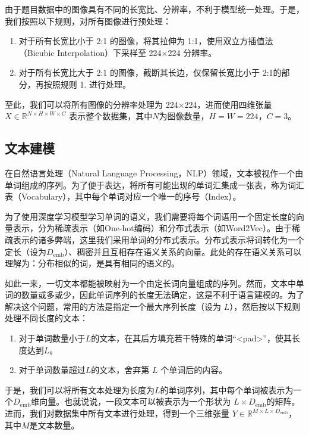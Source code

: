 \documentclass[a4paper]{zreport}
\begin{document}
由于题目数据中的图像具有不同的长宽比、分辨率，不利于模型统一处理。于是，我们按照以下规则，对所有图像进行预处理：

\begin{enumerate}
\item 对于所有长宽比小于 2:1 的图像，将其拉伸为 1:1，使用双立方插值法（Bicubic Interpolation）下采样至 224$\times$224 分辨率。
\item 对于所有长宽比大于 2:1 的图像，截断其长边，仅保留长宽比小于 2:1的部分，再按照规则 1. 进行处理。
\end{enumerate}

至此，我们可以将所有图像的分辨率处理为 224$\times$224，进而使用四维张量 $X \in \mathbb{R}^{N \times H \times W \times C}$ 表示整个数据集，其中$N$为图像数量，$H=W=224$，$C=3$。

\subsection{文本建模}

在自然语言处理（Natural Language Processing，NLP）领域，文本被视作一个由单词组成的序列。为了便于表达，将所有可能出现的单词汇集成一张表，称为词汇表（Vocabulary），其中每个单词对应一个唯一的序号（Index）。

为了使用深度学习模型学习单词的语义，我们需要将每个词语用一个固定长度的向量表示，分为稀疏表示（如One-hot编码）和分布式表示（如Word2Vec）。由于稀疏表示的诸多弊端，这里我们采用单词的分布式表示。分布式表示将词转化为一个定长（设为$D_\mathrm{emb}$）、稠密并且互相存在语义关系的向量。此处的存在语义关系可以理解为：分布相似的词，是具有相同的语义的。

如此一来，一切文本都能被映射为一个由定长词向量组成的序列。然而，文本中单词的数量或多或少，因此单词序列的长度无法确定，这是不利于语言建模的。为了解决这个问题，常用的方法是指定一个最大序列长度（设为 $L$），然后按以下规则处理不同长度的文本：

\begin{enumerate}
\item 对于单词数量小于$L$的文本，在其后方填充若干特殊的单词“<pad>”，使其长度达到$L$。
\item 对于单词数量超过$L$的文本，舍弃第 $L$ 个单词后的内容。
\end{enumerate}

于是，我们可以将所有文本处理为长度为$L$的单词序列，其中每个单词被表示为一个$D_\mathrm{emb}$维向量。也就说说，一段文本可以被表示为一个形状为 $L \times D_\mathrm{emb}$的矩阵。进而，我们对数据集中所有文本进行处理，得到一个三维张量 $Y \in \mathbb{R}^{M \times L \times D_\mathrm{emb}}$，其中$M$是文本数量。
\end{document}
